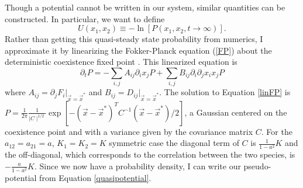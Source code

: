 Though a potential cannot be written in our system, similar quantities can be constructed. 
In particular, we want to define
\begin{equation}
U(x_1,x_2) \equiv -\ln\left[P(x_1,x_2,t\rightarrow\infty)\right].
\label{quasipotential}
\end{equation}
Rather than getting this quasi-steady state probability from numerics, I approximate it by linearizing the Fokker-Planck equation (\ref{FP}) about the deterministic coexistence fixed point \cite{VanKampen1992}. 
This linearized equation is
\begin{equation}
\partial_t P = -\sum_{i,j} A_{ij}\partial_i x_j P + \sum_{i,j} B_{ij} \partial_i\partial_j x_i x_j P
\label{linFP}
\end{equation}
where $A_{ij}=\partial_j F_i \lvert_{\vec{x}=\vec{x}^*}$ and $B_{ij}=D_{ij} \lvert_{\vec{x}=\vec{x}^*}$. 
The solution to Equation \ref{linFP} is $P=\frac{1}{2\pi}\frac{1}{\mid C\mid^{1/2}}\exp[-(\vec{x} - \vec{x}^*)^T C^{-1}(\vec{x} - \vec{x}^*)/2]$, a Gaussian centered on the coexistence point and with a variance given by the covariance matrix $C$. 
For the $a_{12}=a_{21}=a$, $K_1=K_2=K$ symmetric case the diagonal term of $C$ is $\frac{1}{1-a^2}K$ and the off-diagonal, which corresponds to the correlation between the two species, is $-\frac{a}{1-a^2}K$. 
Since we now have a probability density, I can write our pseudo-potential from Equation \ref{quasipotential}. 

